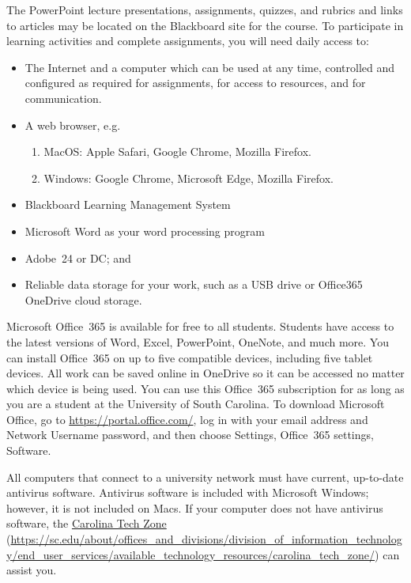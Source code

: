 \documentclass[11pt,letterpaper]{article}
\begin{document}
The PowerPoint lecture presentations, assignments, quizzes, and rubrics and links to articles may be located on the Blackboard site for the course. To participate in learning activities and complete assignments, you will need daily access to:
	\begin{itemize}
	\item The Internet and a computer which can be used at any time, controlled and configured as required for assignments, for access to resources, and for communication.
	\item A web browser, e.g. 
		\begin{enumerate}[--]
		\item MacOS\texttrademark: Apple Safari, Google Chrome, Mozilla Firefox.
		\item Windows\texttrademark: Google Chrome, Microsoft Edge, Mozilla Firefox.
		\end{enumerate}
	\item Blackboard Learning Management System
	\item Microsoft Word as your word processing program
	\item Adobe~24 or DC; and
	\item Reliable data storage for your work, such as a USB drive or Office365 OneDrive cloud storage.
	\end{itemize}
Microsoft Office~365 is available for free to all students. Students have access to the latest versions of Word, Excel, PowerPoint, OneNote, and much more. You can install Office~365 on up to five compatible devices, including five tablet devices. All work can be saved online in OneDrive so it can be accessed no matter which device is being used. You can use this Office~365 subscription for as long as you are a student  at the University of South Carolina. To download Microsoft Office, go to \url{https://portal.office.com/}, log in with your email address and Network Username password, and then choose Settings, Office~365 settings, Software. \pspace

All computers that connect to a university network must have current, up-to-date antivirus software. Antivirus software is included with Microsoft Windows; however, it is not included on Macs. If your computer does not have antivirus software, the \href{https://sc.edu/about/offices\_and\_divisions/division\_of\_information\_technology/end\_user\_services/available\_technology\_resources/carolina\_tech\_zone/}{Carolina Tech Zone} (\url{https://sc.edu/about/offices\_and\_divisions/division\_of\_information\_technology/end\_user\_services/available\_technology\_resources/carolina\_tech\_zone/}) can assist you. \pspace
\end{document}
